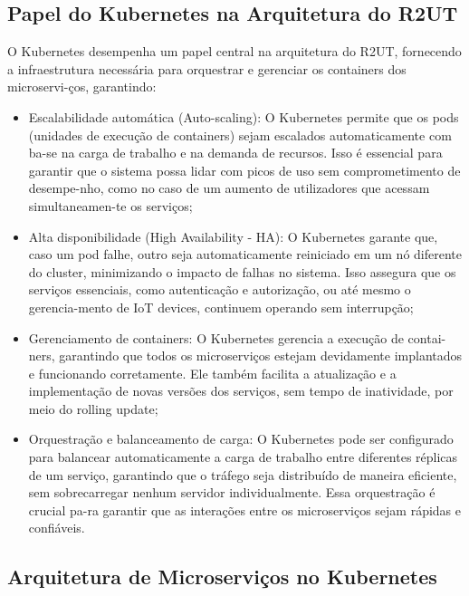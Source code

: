 
\subsection{Papel do Kubernetes na Arquitetura do R2UT}

O Kubernetes desempenha um papel central na arquitetura do R2UT, fornecendo a infraestrutura necessária para orquestrar e gerenciar os containers dos microservi-ços, garantindo:

\begin{itemize}
    \item Escalabilidade automática (Auto-scaling): O Kubernetes permite que os pods (unidades de execução de containers) sejam escalados automaticamente com ba-se na carga de trabalho e na demanda de recursos. Isso é essencial para garantir que o sistema possa lidar com picos de uso sem comprometimento de desempe-nho, como no caso de um aumento de utilizadores que acessam simultaneamen-te os serviços;
    \item Alta disponibilidade (High Availability - HA): O Kubernetes garante que, caso um pod falhe, outro seja automaticamente reiniciado em um nó diferente do cluster, minimizando o impacto de falhas no sistema. Isso assegura que os serviços essenciais, como autenticação e autorização, ou até mesmo o gerencia-mento de IoT devices, continuem operando sem interrupção;
    \item Gerenciamento de containers: O Kubernetes gerencia a execução de contai-ners, garantindo que todos os microserviços estejam devidamente implantados e funcionando corretamente. Ele também facilita a atualização e a implementação de novas versões dos serviços, sem tempo de inatividade, por meio do rolling update;
    \item Orquestração e balanceamento de carga: O Kubernetes pode ser configurado para balancear automaticamente a carga de trabalho entre diferentes réplicas de um serviço, garantindo que o tráfego seja distribuído de maneira eficiente, sem sobrecarregar nenhum servidor individualmente. Essa orquestração é crucial pa-ra garantir que as interações entre os microserviços sejam rápidas e confiáveis.
\end{itemize}

\subsection{Arquitetura de Microserviços no Kubernetes}

